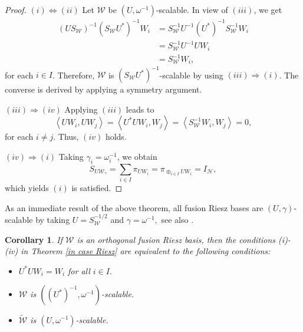 \documentclass[sn-mathphys-num]{sn-jnl}%
\newtheorem{corollary}[theorem]{Corollary}
\theoremstyle{definition}
\theoremstyle{remark}
\numberwithin{equation}{section}
\begin{document}
\begin{proof}
$(i)\Leftrightarrow (ii)$ Let $\mathcal{W}$ be $\left( U,\omega^{-1}\right) $-scalable. In view of $(iii)$, we get
\begin{align*}
\left( US_{\mathcal{W}}\right) ^{-1}\left( S_{\mathcal{W}}U^*\right) ^{-1}W_{i}&=S_{\mathcal{W}}^{-1}U^{-1}\left( U^*\right) ^{-1}S_{\mathcal{W}}^{-1}W_{i}
\\&=S_{\mathcal{W}}^{-1}U^{-1}UW_{i}
\\&=S_{\mathcal{W}}^{-1}W_{i},
\end{align*}
for each $ i\in I $. Therefore, $\mathcal{W}$ is $\left( S_{\mathcal{W}}U^*\right) ^{-1}$-scalable by using $(iii)\Rightarrow(i)$. The converse is derived by applying a symmetry argument.



$(iii)\Rightarrow (iv)$ Applying $(iii)$ leads to 
\begin{equation*}
\left\langle UW_{i},UW_{j} \right\rangle = \left\langle U^{*}UW_{i},W_{j} \right\rangle = \left\langle S_{\mathcal{W}}^{-1}W_{i},W_{j} \right\rangle =0,
\end{equation*}
for each $i\neq j.$ Thus, $(iv)$ holds.


$(iv)\Rightarrow (i)$ Taking $ \gamma_{i}=\omega_{i}^{-1}$, we obtain
\begin{equation*}
S_{U\mathcal{W}_{\gamma}}=\sum_{i \in I} \pi_{UW_{i}}=\pi_{\oplus_{i \in I} UW_{i}}=I_{\mathcal {H}},
\end{equation*}
which yields $(i)$ is satisfied.
\end{proof}

As an immediate result of the above theorem, all fusion Riesz bases are $(U,\gamma)$-scalable by taking $U=S_{\mathcal{W}}^{-1/2}$ and $\gamma=\omega^{-1},$ see also \cite[Proposition 4.7]{Excess 1}.

\begin{corollary}\label{orth. case}
If $\mathcal{W}$ is an orthogonal fusion Riesz basis, then the conditions (i)-(iv) in Theorem \ref{in case Riesz} are equivalent to the following conditions:
\begin{itemize}
\item[$(v)$] $U^*UW_{i}=W_{i}$ for all $ i \in I.$ 
\item[$(vi)$] $\mathcal{W}$ is $\left( \left( U^*\right) ^{-1},\omega^{-1}\right) $-scalable.
\item[$(vii)$] $\widetilde{\mathcal{W}}$ is $\left( U,\omega^{-1}\right) $-scalable.
\end{itemize}
\end{corollary}
\end{document}
